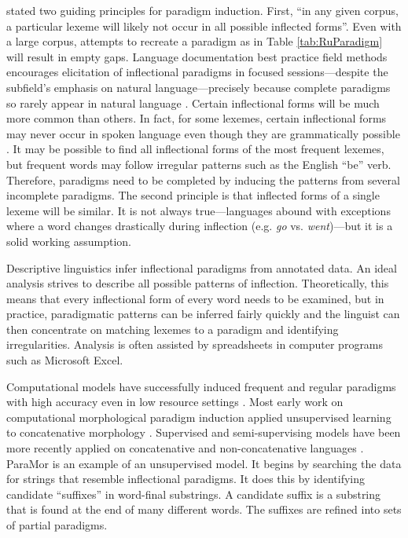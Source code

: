 \documentclass[12pt]{article}
\begin{document}
 stated two guiding principles for paradigm induction. First, ``in any given corpus, a particular lexeme will likely not occur in all possible inflected forms''.  Even with a large corpus, attempts to recreate a paradigm as in Table \ref{tab:RuParadigm} will result in empty gaps. Language documentation best practice field methods encourages elicitation of inflectional paradigms in focused sessions---despite the subfield's emphasis on natural language---precisely because complete paradigms so rarely appear in natural language \cite{lupke_data_2010}. Certain inflectional forms will be much more common than others. In fact, for some lexemes, certain inflectional forms may never occur in spoken language even though they are grammatically possible \cite{silfverberg_encoder-decoder_2018}. It may be possible to find all inflectional forms of the most frequent lexemes, but frequent words may follow irregular patterns such as the English ``be'' verb. Therefore, paradigms need to be completed by inducing the patterns from several incomplete paradigms. The second principle is that inflected forms of a single lexeme will be similar. It is not always true---languages abound with exceptions where a word changes drastically during inflection (e.g. \textit{go} vs. \textit{went})---but it is a solid working assumption.  

Descriptive linguistics infer inflectional paradigms from annotated data. An ideal analysis strives to describe all possible patterns of inflection. Theoretically, this means that every inflectional form of every word needs to be examined, but in practice, paradigmatic patterns can be inferred fairly quickly and the linguist can then concentrate on matching lexemes to a paradigm and identifying irregularities. Analysis is often assisted by spreadsheets in computer programs such as Microsoft Excel.

Computational models have successfully induced frequent and regular paradigms with high accuracy even in low resource settings \cite{hammarstrom_unsupervised_2011,durrett_supervised_2013,ahlberg_semi-supervised_2014}. Most early work on computational morphological paradigm induction applied unsupervised learning to concatenative morphology \cite{goldsmith_unsupervised_2001,chan_learning_2006,monson_paramorfinding_2007b}. Supervised and semi-supervising models have been more recently applied on concatenative and non-concatenative languages \cite{dreyer_discovering_2011,durrett_supervised_2013}. ParaMor \cite{monson_paramorMinimally_2007a} is an example of an unsupervised model. It begins by searching the data for strings that resemble inflectional paradigms. It does this by identifying candidate ``suffixes'' in word-final substrings. A candidate suffix is a substring that is found at the end of many different words. The suffixes are refined into sets of partial paradigms. 
\end{document}
